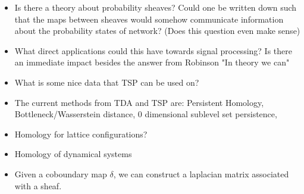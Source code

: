 \documentclass[12pt]{article}
\begin{document}
\begin{itemize}
  \item Is there a theory about probability sheaves? Could one be written down such that
    the maps between sheaves would somehow communicate information about the probability 
    states of network? (Does this question even make sense)

  \item What direct applications could this have towards signal processing? Is there an immediate
    impact besides the answer from Robinson "In theory we can"

  \item What is some nice data that TSP can be used on?

  \item The current methods from TDA and TSP are: Persistent Homology, Bottleneck/Wasserstein distance, 
    0 dimensional sublevel set persistence, 

  \item Homology for lattice configurations?

  \item Homology of dynamical systems

  \item Given a coboundary map $\delta$, we can construct a laplacian matrix associated with a sheaf.

\end{itemize}
\end{document}
